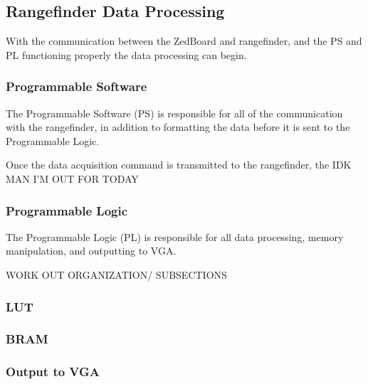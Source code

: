 \subsection{Rangefinder Data Processing}
With the communication between the ZedBoard and rangefinder, and the PS and PL functioning properly the data processing can begin.

\subsubsection{Programmable Software}
The Programmable Software (PS) is responsible for all of the communication with the rangefinder, in addition to formatting the data before it is sent to the Programmable Logic.
\par
Once the data acquisition command is transmitted to the rangefinder, the IDK MAN I'M OUT FOR TODAY


\subsubsection{Programmable Logic}
The Programmable Logic (PL) is responsible for all data processing, memory manipulation, and outputting to VGA.


\par
WORK OUT ORGANIZATION/ SUBSECTIONS
\subsubsection{LUT}
\subsubsection{BRAM}
\subsubsection{Output to VGA}
